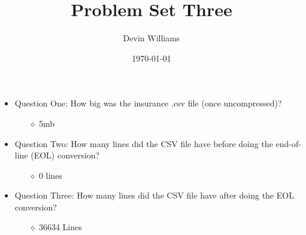 \documentclass[12pt,letterpaper]{article}
\title{\textbf{Problem Set Three}}
\author{Devin Williams}
\date{\today}
\begin{document}
\maketitle

\begin{itemize}
    \item Question One: How big was the insurance .csv file (once uncompressed)?
        \begin{itemize}
            \item[$\diamond$] 5mb
        \end{itemize}
    \item Question Two: How many lines did the CSV file have before doing the end-of-line (EOL) conversion?
       \begin{itemize}
        \item[$\diamond$] 0 lines
        \end{itemize}
    \item Question Three: How many lines did the CSV file have after doing the EOL conversion? 
        \begin{itemize}
        \item[$\diamond$] 36634 Lines
        \end{itemize}
        \end{itemize}
\end{document}
